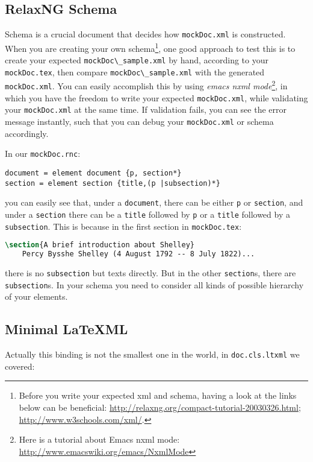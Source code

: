 \documentclass[a4paper]{article}
\def\latexml{{\LaTeX}ML\xspace}
\begin{document}
\subsection{RelaxNG Schema}
Schema is a crucial document that decides how \lstinline|mockDoc.xml| is constructed. When you are creating your own schema\footnote{Before you write your expected xml and schema, having a look at the links below can be beneficial: \url{http://relaxng.org/compact-tutorial-20030326.html}; \url{http://www.w3schools.com/xml/}. }, one good approach to test this is to create your expected \lstinline|mockDoc\_sample.xml| by hand, according to your \lstinline|mockDoc.tex|, then compare \lstinline|mockDoc\_sample.xml| with the generated \lstinline|mockDoc.xml|. You can easily accomplish this by using \textit{emacs nxml mode}\footnote{Here is a tutorial about Emacs nxml mode: \url{http://www.emacswiki.org/emacs/NxmlMode}}, in which you have the freedom to write your expected \lstinline|mockDoc.xml|, while validating your \lstinline|mockDoc.xml| at the same time. If validation fails, you can see the error message instantly, such that you can debug your \lstinline|mockDoc.xml| or schema accordingly.

 In our \lstinline|mockDoc.rnc|:
\begin{lstlisting}
document = element document {p, section*}
section = element section {title,(p |subsection)*}
\end{lstlisting}
you can easily see that, under a \lstinline|document|, there can be either \lstinline|p| or \lstinline|section|, and under a \lstinline|section| there can be a \lstinline|title| followed by \lstinline|p| or a \lstinline|title| followed by a \lstinline|subsection|. This is because in the first section in \lstinline|mockDoc.tex|:
\begin{lstlisting}[language=TeX]
\section{A brief introduction about Shelley}
    Percy Bysshe Shelley (4 August 1792 -- 8 July 1822)...
\end{lstlisting}
there is no \lstinline|subsection| but texts directly. But in the other \lstinline|section|s, there are \lstinline|subsection|s. In your schema you need to consider all kinds of possible hierarchy of your elements.

\subsection{Minimal \latexml}
Actually this binding is not the smallest one in the world, in \lstinline|doc.cls.ltxml|
we covered:
\end{document}
